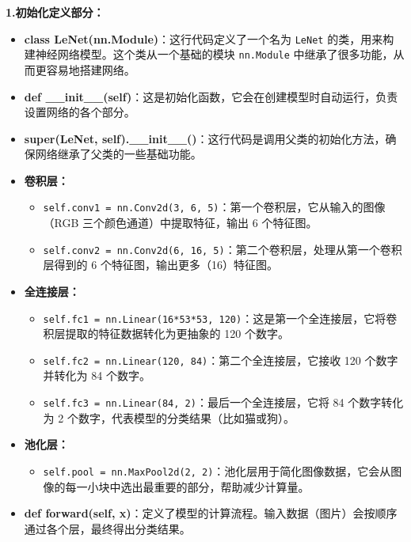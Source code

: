 \textbf{1.初始化定义部分：}
\begin{itemize}
    \item \textbf{class LeNet(nn.Module)}：这行代码定义了一个名为 \texttt{LeNet} 的类，用来构建神经网络模型。这个类从一个基础的模块 \texttt{nn.Module} 中继承了很多功能，从而更容易地搭建网络。
    
    \item \textbf{def \_\_init\_\_(self)}：这是初始化函数，它会在创建模型时自动运行，负责设置网络的各个部分。

    \item \textbf{super(LeNet, self).\_\_init\_\_()}：这行代码是调用父类的初始化方法，确保网络继承了父类的一些基础功能。

    \item \textbf{卷积层：}
    \begin{itemize}
        \item \texttt{self.conv1 = nn.Conv2d(3, 6, 5)}：第一个卷积层，它从输入的图像（RGB 三个颜色通道）中提取特征，输出 6 个特征图。
        \item \texttt{self.conv2 = nn.Conv2d(6, 16, 5)}：第二个卷积层，处理从第一个卷积层得到的 6 个特征图，输出更多（16）特征图。
    \end{itemize}

    \item \textbf{全连接层：}
    \begin{itemize}
        \item \texttt{self.fc1 = nn.Linear(16*53*53, 120)}：这是第一个全连接层，它将卷积层提取的特征数据转化为更抽象的 120 个数字。
        \item \texttt{self.fc2 = nn.Linear(120, 84)}：第二个全连接层，它接收 120 个数字并转化为 84 个数字。
        \item \texttt{self.fc3 = nn.Linear(84, 2)}：最后一个全连接层，它将 84 个数字转化为 2 个数字，代表模型的分类结果（比如猫或狗）。
    \end{itemize}

    \item \textbf{池化层：}
    \begin{itemize}
        \item \texttt{self.pool = nn.MaxPool2d(2, 2)}：池化层用于简化图像数据，它会从图像的每一小块中选出最重要的部分，帮助减少计算量。
    \end{itemize}

    \item \textbf{def forward(self, x)}：定义了模型的计算流程。输入数据（图片）会按顺序通过各个层，最终得出分类结果。
\end{itemize}

